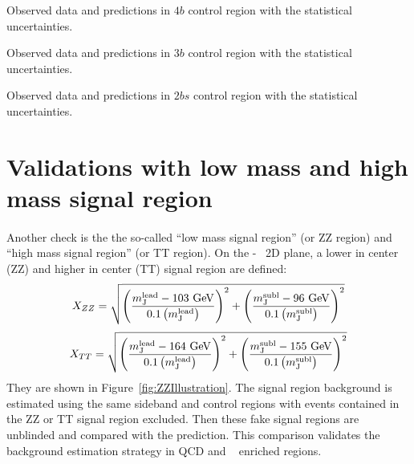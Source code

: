 \begin{table}[htb!]
\begin{center}
\caption{Observed data and predictions in $4b$ control region with the statistical uncertainties.}

\label{tab:Tab_4b_CR_Variations}
\end{center}
\end{table}

\begin{table}[htb!]
\begin{center}
\caption{Observed data and predictions in $3b$ control region with the statistical uncertainties.}

\label{tab:Tab_3b_CR_Variations}
\end{center}
\end{table}

\begin{table}[htb!]
\begin{center}
\caption{Observed data and predictions in $2bs$ control region with the statistical uncertainties.}

\label{tab:Tab_2bs_CR_Variations}
\end{center}
\end{table}


\clearpage
\section{Validations with low mass and high mass signal region}
\label{sec:boosted-ZZ-Rehearsal}
\paragraph{}
Another check is the the so-called ``low mass signal region'' (or ZZ region) and ``high mass signal region'' (or TT region). 
On the \mleadJ-\msublJ~ 2D plane, a lower in center (ZZ) and higher in center (TT) signal region are defined: 
\begin{equation}
X_{ZZ} = \sqrt{\left(\frac{m^{\rm lead}_{\rm J} - \text{103 GeV}}{0.1 \left(m^{\rm lead}_{\rm J}\right)}\right)^2 + \left(\frac{m^{\rm subl}_{\rm J}- \text{96 GeV}}{0.1 \left(m^{\rm subl}_{\rm J}\right)}\right)^2}
\label{eq:boosted_Xzz}
\end{equation}
\begin{equation}
X_{TT} = \sqrt{\left(\frac{m^{\rm lead}_{\rm J} - \text{164 GeV}}{0.1 \left(m^{\rm lead}_{\rm J}\right)}\right)^2 + \left(\frac{m^{\rm subl}_{\rm J}- \text{155 GeV}}{0.1 \left(m^{\rm subl}_{\rm J}\right)}\right)^2}
\label{eq:boosted_Xtt}
\end{equation}
They are shown in Figure~\ref{fig:ZZIllustration}. 
The signal region background is estimated using the same sideband and control regions with events contained in the ZZ or TT signal region excluded. 
Then these fake signal regions are unblinded and compared with the prediction. 
This comparison validates the background estimation strategy in QCD and \ttbar~ enriched regions.

